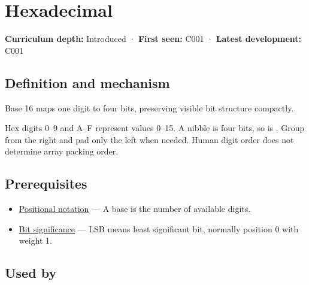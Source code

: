 \hypertarget{appendix-6b8075763724}{}\label{referencestart:appendix-6b8075763724}
\section{Hexadecimal}\label{appendix-6b8075763724-hexadecimal}

\hypertarget{appendix-6b8075763724-hexadecimal}{}

\textbf{Curriculum depth:} Introduced · \textbf{First seen:} C001 · \textbf{Latest development:} C001

\begin{allmightroledefinition}

\subsection{Definition and mechanism}\label{appendix-6b8075763724-definition-and-mechanism}

\hypertarget{appendix-6b8075763724-definition-and-mechanism}{}

Base 16 maps one digit to four bits, preserving visible bit structure compactly.

\end{allmightroledefinition}

Hex digits 0--9 and A--F represent values 0--15. A nibble is four bits, so  is . Group from the right and pad only the left when needed. Human digit order does not determine array packing order.

\subsection{Prerequisites}\label{appendix-6b8075763724-prerequisites}

\hypertarget{appendix-6b8075763724-prerequisites}{}

\begin{itemize}
\tightlist
\item
  \hyperref[appendix-83c3f28f7bda]{Positional notation} --- A base is the number of available digits.
\item
  \hyperref[appendix-280445746493]{Bit significance} --- LSB means least significant bit, normally position 0 with weight 1.
\end{itemize}

\subsection{Used by}\label{appendix-6b8075763724-used-by}

